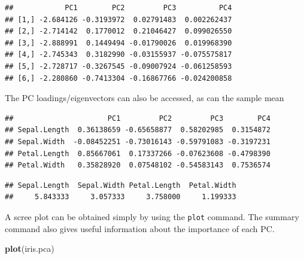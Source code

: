 \documentclass[]{book}
\newenvironment{Shaded}{\begin{snugshade}}{\end{snugshade}}
\newcommand{\CommentTok}[1]{\textcolor[rgb]{0.56,0.35,0.01}{\textit{#1}}}
\newcommand{\KeywordTok}[1]{\textcolor[rgb]{0.13,0.29,0.53}{\textbf{#1}}}
\newcommand{\NormalTok}[1]{#1}
\newcommand{\OperatorTok}[1]{\textcolor[rgb]{0.81,0.36,0.00}{\textbf{#1}}}
\theoremstyle{definition}
\theoremstyle{definition}
\theoremstyle{definition}
\theoremstyle{remark}
\begin{document}
\begin{verbatim}
##            PC1        PC2         PC3          PC4
## [1,] -2.684126 -0.3193972  0.02791483  0.002262437
## [2,] -2.714142  0.1770012  0.21046427  0.099026550
## [3,] -2.888991  0.1449494 -0.01790026  0.019968390
## [4,] -2.745343  0.3182990 -0.03155937 -0.075575817
## [5,] -2.728717 -0.3267545 -0.09007924 -0.061258593
## [6,] -2.280860 -0.7413304 -0.16867766 -0.024200858
\end{verbatim}

The PC loadings/eigenvectors can also be accessed, as can the sample mean

\begin{Shaded}
\end{Shaded}

\begin{verbatim}
##                      PC1         PC2         PC3        PC4
## Sepal.Length  0.36138659 -0.65658877  0.58202985  0.3154872
## Sepal.Width  -0.08452251 -0.73016143 -0.59791083 -0.3197231
## Petal.Length  0.85667061  0.17337266 -0.07623608 -0.4798390
## Petal.Width   0.35828920  0.07548102 -0.54583143  0.7536574
\end{verbatim}

\begin{Shaded}
\end{Shaded}

\begin{verbatim}
## Sepal.Length  Sepal.Width Petal.Length  Petal.Width 
##     5.843333     3.057333     3.758000     1.199333
\end{verbatim}

A scree plot can be obtained simply by using the \texttt{plot} command. The summary command also gives useful information about the importance of each PC.

\begin{Shaded}
\begin{Highlighting}[]
\KeywordTok{plot}\NormalTok{(iris.pca)}
\end{Highlighting}
\end{Shaded}
\end{document}
